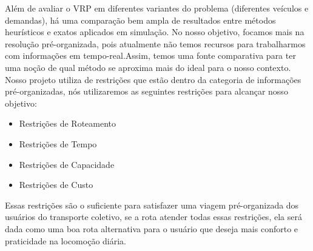  Além de avaliar o VRP em diferentes variantes do problema (diferentes veículos e demandas), há uma comparação bem ampla de resultados entre métodos heurísticos e exatos aplicados em simulação. No nosso objetivo, focamos mais na resolução pré-organizada, pois atualmente não temos recursos para trabalharmos com informações em tempo-real.Assim, temos uma fonte comparativa para ter uma noção de qual método se aproxima mais do ideal para o nosso contexto. Nosso projeto utiliza de restrições que estão dentro da categoria de informações pré-organizadas, nós utilizaremos as seguintes restrições para alcançar nosso objetivo:
 
\begin{itemize}
\item Restrições de Roteamento
\item Restrições de Tempo
\item Restrições de Capacidade
\item Restrições de Custo
\end{itemize}

Essas restrições são o suficiente para satisfazer uma viagem pré-organizada dos usuários do transporte coletivo, se a rota atender todas essas restrições, ela será dada como uma boa rota alternativa para o usuário que deseja mais conforto e praticidade na locomoção diária.
 